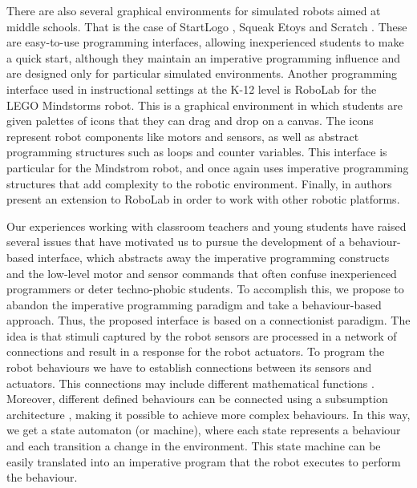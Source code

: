 There are also several graphical environments for simulated robots aimed at middle schools. That is the case of StartLogo \cite{startlogo}, Squeak Etoys \cite{etoys} and Scratch \cite{scratch}. These are easy-to-use programming interfaces, allowing inexperienced students to make a quick start, although they maintain an imperative programming influence and are designed only for particular simulated environments. Another programming interface used in instructional settings at the K-12 level is RoboLab \cite{robolab} for the LEGO Mindstorms robot. This is a graphical environment in which students are given palettes of icons that they can drag and drop on a canvas. The icons represent robot components like motors and sensors, as well as abstract programming structures such as loops and counter variables. This interface is particular for the Mindstrom robot, and once again uses imperative programming structures that add complexity to the robotic environment. Finally, in \cite{robolab-ext} authors present an extension to RoboLab in order to work with other robotic platforms. 


Our experiences working with classroom teachers and young students have raised several issues that have motivated us to pursue the development of a behaviour-based interface, which abstracts away the imperative programming constructs and the low-level motor and sensor commands that often confuse inexperienced programmers or deter techno-phobic students. To accomplish this, we propose to abandon the imperative programming paradigm and take a behaviour-based approach. Thus, the proposed interface is based on a connectionist paradigm. The idea is that stimuli captured by the robot sensors are processed in a network of connections and result in a response for the robot actuators. To program the robot behaviours we have to establish connections between its sensors and actuators. This connections may include different mathematical functions \cite{braitenberg}. Moreover, different defined behaviours can be connected using a subsumption architecture \cite{subsumicion}, making it possible to achieve more complex behaviours. In this way, we get a state automaton (or machine), where each state represents a behaviour and each transition a change in the environment. This state machine can be easily translated into an imperative program that the robot executes to perform the behaviour.

